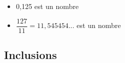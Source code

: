 \begin{Exemple}
\leavevmode\vspace{-\baselineskip}
\begin{itemize}[label=\textcolor{Couleur10}{$\bullet$}]
\item 0,125 est un nombre \ligne

\item $\dfrac{127}{11} = 11,545454...$ est un nombre \ligne

\end{itemize}
\end{Exemple}

\newpage

\subsection{Inclusions}

